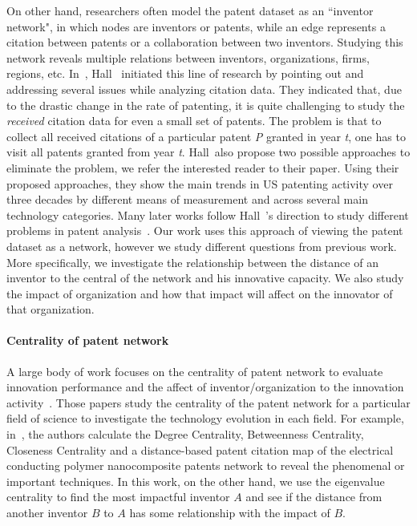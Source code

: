 On other hand, researchers often model the patent dataset as
an ``inventor network", in which nodes are inventors or patents, while an edge
represents a citation between patents or a collaboration between two inventors.
Studying this network reveals multiple relations between inventors,
organizations, firms, regions, etc. In~\cite{Hall01thenber}, Hall~\etal
initiated this line of research by pointing out and addressing several issues
while analyzing citation data. They indicated that, due to the drastic change
in the rate of patenting, it is quite challenging to study the {\em received}
citation data for even a small set of patents. The problem is that to collect
all received citations of a particular patent {\em P} granted in year {\em t},
one has to visit all patents granted from year {\em t}. Hall~\etal also propose
two possible approaches to eliminate the problem, we refer the interested
reader to their paper. Using their proposed approaches, they show the main
trends in US patenting activity over three decades by different means of
measurement and across several main technology categories. Many later works
follow Hall~\etal's direction to study different problems in patent
analysis~\cite{Leskovec:2005, Hall2000, leskovec2007graph, Acs2002}. 
Our work uses this approach of viewing the patent dataset as a network, however we study 
different questions from previous work. More specifically, we investigate the relationship between the distance of 
an inventor to the central of the network and his innovative capacity. We also study the impact of organization and how that impact will affect on the innovator of that organization.

\paragraph{Centrality of patent network} A large body of work focuses on the centrality 
of patent network to evaluate innovation performance and the affect of inventor/organization to the innovation activity~\cite{Kim2013944, aktamov, Lee2010}. Those papers study the centrality of the patent network for a particular field of science to investigate the technology evolution in each field. For example, in~\cite{Lee2010}, the authors calculate the Degree Centrality, Betweenness Centrality, Closeness Centrality and  a distance-based patent citation map of the electrical conducting polymer nanocomposite patents network to reveal the phenomenal or important techniques. In this work, on the other hand, we use the eigenvalue centrality to find the most impactful inventor $A$ and see if the distance from another inventor $B$ to $A$ has some relationship with the impact of $B$. 

